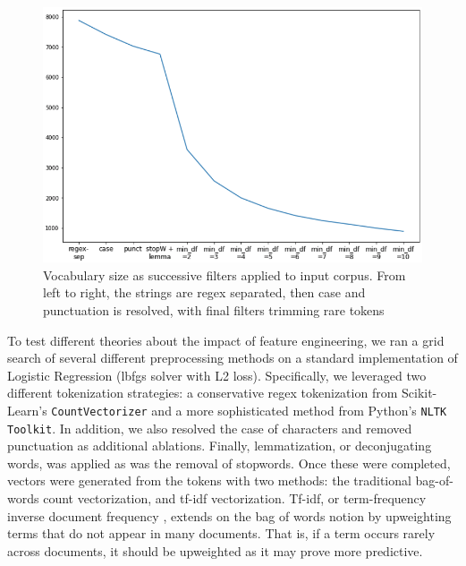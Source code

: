 \documentclass[11pt,a4paper]{article}
\begin{document}
\begin{figure}[htpb]
  \centering
  \includegraphics[width=1\linewidth]{imgs/token_filter.png}
  \caption{Vocabulary size as successive filters applied to input corpus. 
    From left to right, the strings are regex separated, then case and
  punctuation is resolved, with final filters trimming rare tokens}
  \label{fig:imgs/token_filter}
\end{figure}

To test different theories about the impact of feature engineering, we ran a grid search of several different preprocessing methods on a standard implementation of Logistic Regression (lbfgs solver with L2 loss). Specifically, we leveraged two different tokenization strategies: a conservative regex tokenization from Scikit-Learn's \texttt{CountVectorizer} and a more sophisticated method from Python's \texttt{NLTK Toolkit}. In addition, we also resolved the case of characters and removed punctuation as additional ablations. Finally, lemmatization, or deconjugating words, was applied as was the removal of stopwords. Once these were completed, vectors were generated from the tokens with two methods: the traditional bag-of-words \cite {luhn1957statistical} count vectorization, and tf-idf vectorization. Tf-idf, or term-frequency inverse document frequency \cite{jones1972statistical}, extends on the bag of words notion by upweighting terms that do not appear in many documents. That is, if a term occurs rarely across documents, it should be upweighted as it may prove more predictive.
\end{document}
